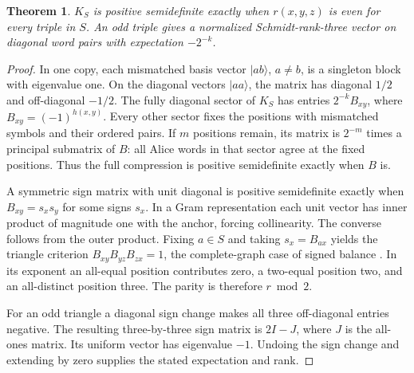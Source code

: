 \documentclass[11pt]{article}
\newtheorem{theorem}{Theorem}
\begin{document}
\begin{theorem}\label{parity}
$K_S$ is positive semidefinite exactly when $r(x,y,z)$ is even for every triple in $S$. An odd triple gives a normalized Schmidt-rank-three vector on diagonal word pairs with expectation $-2^{-k}$.
\end{theorem}
\begin{proof}
In one copy, each mismatched basis vector $|ab\rangle$, $a\ne b$, is a singleton block with eigenvalue one. On the diagonal vectors $|aa\rangle$, the matrix has diagonal $1/2$ and off-diagonal $-1/2$. The fully diagonal sector of $K_S$ has entries $2^{-k}B_{xy}$, where $B_{xy}=(-1)^{h(x,y)}$. Every other sector fixes the positions with mismatched symbols and their ordered pairs. If $m$ positions remain, its matrix is $2^{-m}$ times a principal submatrix of $B$: all Alice words in that sector agree at the fixed positions. Thus the full compression is positive semidefinite exactly when $B$ is.

A symmetric sign matrix with unit diagonal is positive semidefinite exactly when $B_{xy}=s_xs_y$ for some signs $s_x$. In a Gram representation each unit vector has inner product of magnitude one with the anchor, forcing collinearity. The converse follows from the outer product. Fixing $a\in S$ and taking $s_x=B_{ax}$ yields the triangle criterion $B_{xy}B_{yz}B_{zx}=1$, the complete-graph case of signed balance \cite{harary}. In its exponent an all-equal position contributes zero, a two-equal position two, and an all-distinct position three. The parity is therefore $r\bmod 2$.

For an odd triangle a diagonal sign change makes all three off-diagonal entries negative. The resulting three-by-three sign matrix is $2I-J$, where $J$ is the all-ones matrix. Its uniform vector has eigenvalue $-1$. Undoing the sign change and extending by zero supplies the stated expectation and rank.
\end{proof}
\end{document}
